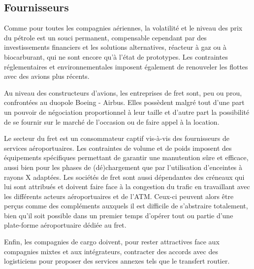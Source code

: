 \subsection{Fournisseurs}

Comme pour toutes les compagnies aériennes, la volatilité et le niveau des prix du pétrole est un souci permanent, compensable cependant par des investissements financiers et les solutions alternatives, réacteur à gaz ou à biocarburant, qui ne sont encore qu'à l'état de prototypes. Les contraintes réglementaires et environnementales imposent également de renouveler les flottes avec des avions plus récents.

Au niveau des constructeurs d'avions, les entreprises de fret sont, peu ou prou, confrontées au duopole Boeing - Airbus. Elles possèdent malgré tout d'une part un pouvoir de négociation proportionnel à leur taille et d'autre part la possibilité de se fournir sur le marché de l'occasion ou de faire appel à la location.

Le secteur du fret est un consommateur captif vis-à-vis des fournisseurs de services aéroportuaires. Les contraintes de volume et de poids imposent des équipements spécifiques permettant de garantir une manutention sûre et efficace, aussi bien pour les phases de (dé)chargement que par l'utilisation d'enceintes à rayons X adaptées. Les sociétés de fret sont aussi dépendantes des créneaux qui lui sont attribués et doivent faire face à la congestion du trafic en travaillant avec les différents acteurs aéroportuaires et de l'ATM. Ceux-ci peuvent alors être perçus comme des compléments auxquels il est difficile de s'abstraire totalement, bien qu'il soit possible dans un premier temps d'opérer tout ou partie d'une plate-forme aéroportuaire dédiée au fret.

Enfin, les compagnies de cargo doivent, pour rester attractives face aux compagnies mixtes et aux intégrateurs, contracter des accords avec des logisticiens pour proposer des services annexes tels que le transfert routier.